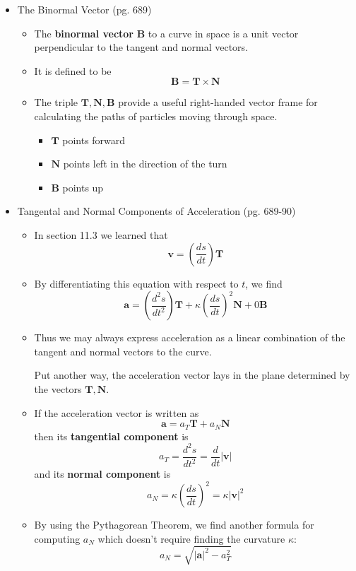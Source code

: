 \documentclass[12pt]{article}
\renewcommand{\vec}[1]{\mathbf{#1}}
\newcommand{\<}{\left<}
\renewcommand{\>}{\right>}
\begin{document}
  \begin{itemize}
  
  \item The Binormal Vector (pg. 689)
  
    \begin{itemize}
    \item The \textbf{binormal vector} $\vec{B}$ to a curve in space is a unit vector perpendicular to the tangent and normal vectors.
    \item It is defined to be \[\vec{B} = \vec{T} \times \vec{N}\]
    \item The triple $\vec{T},\vec{N},\vec{B}$ provide a useful right-handed vector frame for calculating the paths of particles moving through space.
      \begin{itemize}
      \item $\vec{T}$ points forward
      \item $\vec{N}$ points left in the direction of the turn
      \item $\vec{B}$ points up
      \end{itemize}
    \end{itemize}
    
  \item Tangental and Normal Components of Acceleration (pg. 689-90)
  
    \begin{itemize}
    \item In section 11.3 we learned that \[\vec{v} = \left(\frac{ds}{dt}\right)\vec{T}\]
    \item By differentiating this equation with respect to $t$, we find \[\vec{a} = \left(\frac{d^2s}{dt^2}\right)\vec{T} + \kappa\left(\frac{ds}{dt}\right)^2\vec{N}+0\vec{B}\]
    \item Thus we may always express acceleration as a linear combination of the tangent and normal vectors to the curve. 
    
    Put another way, the acceleration vector lays in the plane determined by the vectors $\vec{T},\vec{N}$.
    \item If the acceleration vector is written as
    \[\vec{a} = a_T\vec{T}+a_N\vec{N}\]
    then its \textbf{tangential component} is
    \[a_T = \frac{d^2s}{dt^2} = \frac{d}{dt}|\vec{v}| \]
    and its \textbf{normal component} is
    \[a_N = \kappa\left(\frac{ds}{dt}\right)^2 = \kappa|\vec{v}|^2\]
    \item By using the Pythagorean Theorem, we find another formula for computing $a_N$ which doesn't require finding the curvature $\kappa$:
    \[a_N = \sqrt{|\vec{a}|^2 - a_T^2}\]
    \end{itemize}
  

\end{itemize}
\end{document}
